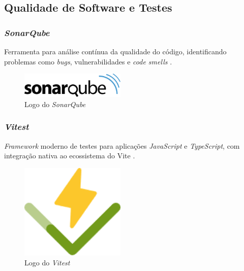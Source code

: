 \subsection{Qualidade de Software e Testes} 

\subsubsection{\emph{SonarQube}} 
Ferramenta para análise contínua da qualidade do código, identificando problemas como \emph{bugs}, vulnerabilidades e \emph{code smells} \cite{sonarqube}.

\begin{figure}[htb]
	\centering
	\includegraphics[width=5cm]{cap04-desenvolvimento/images/4-4-4-1-sonarqube-logo.png}
	\caption{Logo do \emph{SonarQube}}
	\label{fig:sonarqube-logo}
\end{figure}
\FloatBarrier

\subsubsection{\emph{Vitest}}
\emph{Framework} moderno de testes para aplicações \emph{JavaScript} e \emph{TypeScript}, com integração nativa ao ecossistema do Vite \cite{vitest-2025}.

\begin{figure}[htb]
	\centering
	\includegraphics[width=5cm]{cap04-desenvolvimento/images/4-4-4-2-vitest-logo.png}
	\caption{Logo do \emph{Vitest}}
	\label{fig:vitest-logo}
\end{figure}
\FloatBarrier
